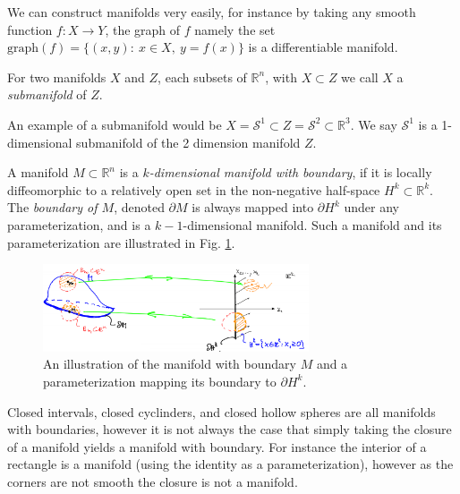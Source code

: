 We can construct manifolds very easily, for instance by taking any smooth function $f:X \to Y$, the graph of $f$ namely the set $ \textrm{graph} (f)=\{(x,y):\ x\in X,\ y=f(x)\}$ is a differentiable manifold. 

\begin{definition}
	For two manifolds $X$ and $Z$, each subsets of $\mathbb{R}^{n}$, with $X \subset Z$ we call $X$ a \emph{submanifold} of $Z$. 
\end{definition}
An example of a submanifold would be $X=\mathcal{S}^{1}\subset Z = \mathcal{S}^{2} \subset \mathbb{R}^{3}$. We say $\mathcal{S}^{1}$ is a 1-dimensional submanifold of the 2 dimension manifold $Z$.

\begin{definition}
	A manifold $M\subset \mathbb{R}^{n}$ is a \emph{$k$-dimensional manifold with boundary}, if it is locally diffeomorphic to a relatively open set in the non-negative half-space $H^{k}\subset \mathbb{R}^{k}$. The \emph{boundary of $M$}, denoted $\partial M$ is always mapped into $\partial H^{k}$ under any parameterization, and is a $k-1$-dimensional manifold. Such a manifold and its parameterization are illustrated in Fig. \ref{fig:bndry_mfd_def}.
	\begin{figure}[h!]
		\centering
		\includegraphics[width=0.7\textwidth]{figures/ch9/5bndry_mfd_def.png}
		\caption{An illustration of the manifold with boundary $M$ and a parameterization mapping its boundary to $\partial H^{k}$.}
		\label{fig:bndry_mfd_def}
	\end{figure}
\end{definition}

Closed intervals, closed cyclinders, and closed hollow spheres are all manifolds with boundaries, however it is not always the case that simply taking the closure of a manifold yields a manifold with boundary. For instance the interior of a rectangle is a manifold (using the identity as a parameterization), however as the corners are not smooth the closure is not a manifold.

